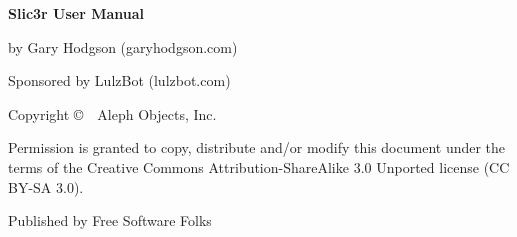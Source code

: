 \clearpage\null\vfill
\begingroup 
\thispagestyle{empty}
\footnotesize\raggedright
\setlength{\parskip}{0.5\baselineskip}

\textbf{Slic3r User Manual}

by Gary Hodgson (garyhodgson.com)

Sponsored by LulzBot (lulzbot.com)

Copyright \copyright\ \the\year\ Aleph Objects, Inc.\par
Permission is granted to copy, distribute and\slash or modify 
this document under the terms of the
Creative Commons Attribution-ShareAlike 3.0 Unported license
(CC BY-SA 3.0).

Published by Free Software Folks

\hfill\texttt{\the\year\the\month\the\day}
\endgroup
\pagebreak{}
